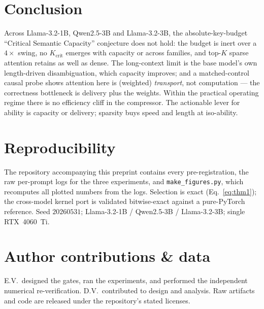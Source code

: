 \documentclass[11pt]{article}
\newcommand{\Kcrit}{K_{\mathrm{crit}}}
\begin{document}
\section{Conclusion}
\label{sec:conc}

Across Llama-3.2-1B, Qwen2.5-3B and Llama-3.2-3B, the absolute-key-budget
``Critical Semantic Capacity'' conjecture does not hold: the budget is inert over a
$4\times$ swing, no $\Kcrit$ emerges with capacity or across families, and top-$K$
sparse attention retains as well as dense. The long-context limit is the base model's
own length-driven disambiguation, which capacity improves; and a matched-control
causal probe shows attention here is (weighted) \emph{transport}, not computation ---
the correctness bottleneck is delivery plus the weights. Within the practical
operating regime there is no efficiency cliff in the compressor. The actionable lever
for ability is capacity or delivery; sparsity buys speed and length at iso-ability.

\section*{Reproducibility}
The repository accompanying this preprint contains every pre-registration, the raw
per-prompt logs for the three experiments, and \texttt{make\_figures.py}, which
recomputes all plotted numbers from the logs. Selection is exact
(Eq.~\ref{eq:thm1}); the cross-model kernel port is validated bitwise-exact against
a pure-PyTorch reference. Seed $20260531$; Llama-3.2-1B / Qwen2.5-3B / Llama-3.2-3B;
single RTX~4060~Ti.

\section*{Author contributions \& data}
E.V.\ designed the gates, ran the experiments, and performed the independent
numerical re-verification. D.V.\ contributed to design and analysis. Raw artifacts
and code are released under the repository's stated licenses.
\end{document}
